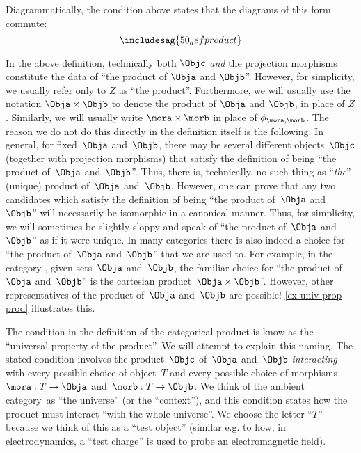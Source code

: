 \begin{remark}
Diagrammatically, the condition above states that the diagrams of this form commute:
\begin{equation}
\includesag{50_defproduct}
\end{equation}
\end{remark}

\begin{remark}\label{prod unique up to iso}
In the above definition, technically both $\Objc$ \emph{and} the projection morphisms  constitute the data of ``the product of $\Obja$ and $\Objb$''. However, for simplicity, we usually refer only to $Z$ as ``the product''. Furthermore, we will usually use the notation $\Obja \times \Objb$ to denote the product of $\Obja$ and $\Objb$, in place of $Z$. Similarly, we will usually write $\mora \times \morb$ in place of $\phi_{\mora, \morb}$. The reason we do not do this directly in the definition itself is the following. In general, for fixed~$\Obja$ and~$\Objb$, there may be several different objects~$\Objc$ (together with projection morphisms) that satisfy the definition of being ``the product of~$\Obja$ and~$\Objb$''. Thus, there is, technically, no such thing as ``\emph{the}'' (unique) product of~$\Obja$ and~$\Objb$. However, one can prove that any two candidates which satisfy the definition of being ``the product of~$\Obja$ and~$\Objb$'' will necessarily be isomorphic in a canonical manner. Thus, for simplicity, we will sometimes be slightly sloppy and speak of ``the product of~$\Obja$ and~$\Objb$'' as if it were unique. In many categories there is also indeed a choice for ``the product of~$\Obja$ and~$\Objb$'' that we are used to. For example, in the category \Set, given sets~$\Obja$ and~$\Objb$, the familiar choice for ``the product of~$\Obja$ and~$\Objb$'' is the cartesian product~$\Obja \times \Objb$''. However, other representatives of the product of~$\Obja$ and~$\Objb$ are possible! \cref{ex univ prop prod} illustrates this.
\end{remark}

\begin{remark}
The condition in the definition of the categorical product is know as the ``universal property of the product''. We will attempt to explain this naming. The stated condition involves the product~$\Objc$ of~$\Obja$ and~$\Objb$ \emph{interacting} with every possible choice of object~$T$ and every possible choice of morphisms~$\mora : T \to \Obja$ and~$\morb: T \to \Objb$. We think of the ambient category~\CatC as ``the universe'' (or the ``context''), and this condition states how the product must interact ``with the whole universe''.
We choose the letter ``$T$'' because we think of this as a ``test object'' (similar e.g. to how, in electrodynamics, a ``test charge'' is used to probe an electromagnetic field).
\end{remark}


